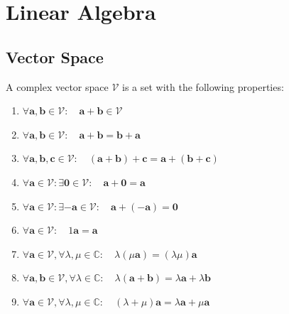 \documentclass[english]{latex4ei/latex4ei_sheet}
\begin{document}
\section{Linear Algebra}
\begin{sectionbox}
  \subsection{Vector Space}
  A complex vector space $\mathcal{V}$ is a set with the following properties:
  \begin{enumerate}
    \item $\forall \boldsymbol{a}, \boldsymbol{b} \in \mathcal{V}: \quad \boldsymbol{a}+\boldsymbol{b} \in \mathcal{V}$
    \item $\forall \boldsymbol{a}, \boldsymbol{b} \in \mathcal{V}: \quad \boldsymbol{a}+\boldsymbol{b}=\boldsymbol{b}+\boldsymbol{a}$
    \item $\forall \boldsymbol{a}, \boldsymbol{b}, \boldsymbol{c} \in \mathcal{V}: \quad(\boldsymbol{a}+\boldsymbol{b})+\boldsymbol{c}=\boldsymbol{a}+(\boldsymbol{b}+\boldsymbol{c})$
    \item $\forall \boldsymbol{a} \in \mathcal{V}: \exists \mathbf{0} \in \mathcal{V}: \quad \boldsymbol{a}+\mathbf{0}=\boldsymbol{a}$
    \item $\forall \boldsymbol{a} \in \mathcal{V}: \exists-\boldsymbol{a} \in \mathcal{V}: \quad \boldsymbol{a}+(-\boldsymbol{a})=\mathbf{0}$
    \item $\forall \boldsymbol{a} \in \mathcal{V}: \quad 1 \boldsymbol{a}=\boldsymbol{a}$
    \item $\forall \boldsymbol{a} \in \mathcal{V}, \forall \lambda, \mu \in \mathbb{C}: \quad \lambda(\mu \boldsymbol{a})=(\lambda \mu) \boldsymbol{a}$
    \item $\forall \boldsymbol{a}, \boldsymbol{b} \in \mathcal{V}, \forall \lambda \in \mathbb{C}: \quad \lambda(\boldsymbol{a}+\boldsymbol{b})=\lambda \boldsymbol{a}+\lambda \boldsymbol{b}$
    \item $\forall \boldsymbol{a} \in \mathcal{V}, \forall \lambda, \mu \in \mathbb{C}: \quad(\lambda+\mu) \boldsymbol{a}=\lambda \boldsymbol{a}+\mu \boldsymbol{a}$
  \end{enumerate}
\end{sectionbox}
\end{document}
